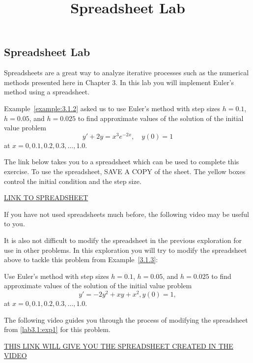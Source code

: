 \documentclass{ximera}
\title{Spreadsheet Lab} \license{CC BY-NC-SA 4.0}
\begin{document}
\begin{abstract}
\end{abstract}
\maketitle

\begin{onlineOnly}
\section*{Spreadsheet Lab}
\end{onlineOnly}
 
Spreadsheets are a great way to analyze iterative processes such as the numerical methods presented here in Chapter 3.  In this lab you will implement Euler's method using a spreadsheet.
 
 
\begin{exploration}\label{lab3.1:exp1}
Example~\ref{example:3.1.2} asked us to use Euler's method with step sizes $h=0.1$, $h=0.05$, and $h=0.025$ to
find approximate values of the solution of the initial value problem
$$
y'+2y=x^3e^{-2x},\quad y(0)=1
$$
at $x=0, 0.1, 0.2, 0.3, \ldots, 1.0$.
 
The link below takes you to a spreadsheet which can be used to complete this exercise.  To use the spreadsheet, SAVE A COPY of the sheet.  The yellow boxes control the initial condition and the step size. 
     
\href{https://docs.google.com/spreadsheets/d/1lwpCOPT5r04jL-joCXHSBRkXJdSxftxX46OzJe2II2U/edit?usp=sharing}{LINK TO SPREADSHEET}

If you have not used spreadsheets much before, the following video may be useful to you.


\end{exploration}
 
\begin{exploration}\label{lab3.1:exp2}
 It is also not difficult to modify the spreadsheet in the previous exploration for use in other problems.  In this exploration you will try to modify the spreadsheet above to tackle this problem from Example~\ref{3.1.3}:

Use Euler's method with step sizes $h=0.1$, $h=0.05$, and $h=0.025$ to
find approximate values of the solution of the initial value problem
$$
y'=-2y^2+xy+x^2, y(0)=1,
$$
at $x=0, 0.1, 0.2, 0.3, \ldots, 1.0$.

The following video guides you through the process of modifying the spreadsheet from \ref{lab3.1:exp1} for this problem.


\href{https://docs.google.com/spreadsheets/d/1iJa71Gz8ZEzl69le29bZCFcSTIq6gtpc_xJqqlc6MgE/edit?usp=sharing}{THIS LINK WILL GIVE YOU THE SPREADSHEET CREATED IN THE VIDEO}
    
\end{exploration}
\end{document}
